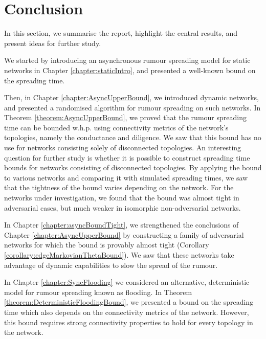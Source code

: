 \chapter{Conclusion}\label{chapter:conclusion}

In this section, we summarise the report, highlight the central results, and present ideas for further study.

We started by introducing an asynchronous rumour spreading model for static networks in Chapter \ref{chapter:staticIntro}, and presented a well-known bound on the spreading time. 

Then, in Chapter \ref{chapter:AsyncUpperBound}, we introduced dynamic networks, and presented a randomised algorithm for rumour spreading on such networks. In Theorem \ref{theorem:AsyncUpperBound}, we proved that the rumour spreading time can be bounded w.h.p. using connectivity metrics of the network's topologies, namely the conductance and diligence. We saw that this bound has no use for networks consisting solely of disconnected topologies. An interesting question for further study is whether it is possible to construct spreading time bounds for networks consisting of disconnected topologies. By applying the bound to various networks and comparing it with simulated spreading times, we saw that the tightness of the bound varies depending on the network. For the networks under investigation, we found that the bound was almost tight in adversarial cases, but much weaker in isomorphic non-adversarial networks. 

In Chapter \ref{chapter:asyncBoundTight}, we strengthened the conclusions of Chapter \ref{chapter:AsyncUpperBound} by constructing a family of adversarial networks for which the bound is provably almost tight (Corollary \ref{corollary:edgeMarkovianThetaBound}). We saw that these networks take advantage of dynamic capabilities to slow the spread of the rumour.

In Chapter \ref{chapter:SyncFlooding} we considered an alternative, deterministic model for rumour spreading known as flooding. In Theorem \ref{theorem:DeterministicFloodingBound}, we presented a bound on the spreading time which also depends on the connectivity metrics of the network. 
However, this bound requires strong connectivity properties to hold for every topology in the network.

